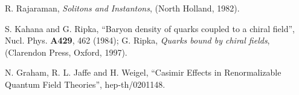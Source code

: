\documentclass[a4paper,prd]{revtex4}
\begin{document}
\begin{thebibliography}{99}
 R. Rajaraman,  {\it Solitons and Instantons}, (North
Holland, 1982).

 S.  Kahana and G.  Ripka,  ``Baryon density of quarks coupled to 
a chiral field'',  Nucl.  Phys.  {\bf A429}, 462 (1984); G.  Ripka, 
{\it Quarks bound by chiral fields},  (Clarendon Press,  Oxford,  1997). 

 N. Graham, R. L. Jaffe and H. Weigel, ``Casimir Effects in
Renormalizable Quantum Field Theories'', hep-th/0201148.
 

\end{thebibliography}
\end{document}
